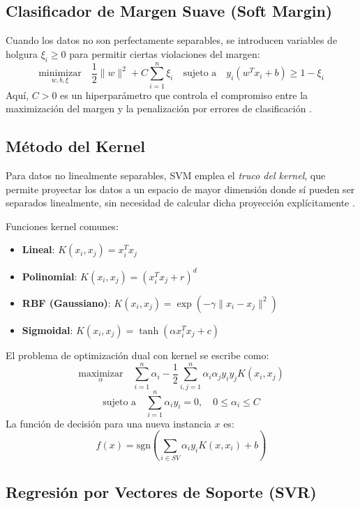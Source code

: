 	\subsection{Clasificador de Margen Suave (Soft Margin)}
	
	Cuando los datos no son perfectamente separables, se introducen variables de holgura $\xi_i \geq 0$ para permitir ciertas violaciones del margen:
	\[
	\underset{w, b, \xi}{\text{minimizar}} \quad \frac{1}{2} \|w\|^2 + C \sum_{i=1}^{n} \xi_i \quad \text{sujeto a} \quad y_i(w^T x_i + b) \geq 1 - \xi_i
	\]
	Aquí, $C > 0$ es un hiperparámetro que controla el compromiso entre la maximización del margen y la penalización por errores de clasificación \citep{james2013, veirana2021}.
	
	\subsection{Método del Kernel}
	
	Para datos no linealmente separables, SVM emplea el \textit{truco del kernel}, que permite proyectar los datos a un espacio de mayor dimensión donde sí pueden ser separados linealmente, sin necesidad de calcular dicha proyección explícitamente \citep{james2013, veirana2021}.
	
	Funciones kernel comunes:
	\begin{itemize}
		\item \textbf{Lineal}: $K(x_i, x_j) = x_i^T x_j$
		\item \textbf{Polinomial}: $K(x_i, x_j) = (x_i^T x_j + r)^d$
		\item \textbf{RBF (Gaussiano)}: $K(x_i, x_j) = \exp(-\gamma \|x_i - x_j\|^2)$
		\item \textbf{Sigmoidal}: $K(x_i, x_j) = \tanh(\alpha x_i^T x_j + c)$
	\end{itemize}
	
	El problema de optimización dual con kernel se escribe como:
	\[
	\underset{\alpha}{\text{maximizar}} \quad \sum_{i=1}^{n} \alpha_i - \frac{1}{2} \sum_{i,j=1}^{n} \alpha_i \alpha_j y_i y_j K(x_i, x_j)
	\]
	\[
	\text{sujeto a} \quad \sum_{i=1}^{n} \alpha_i y_i = 0, \quad 0 \leq \alpha_i \leq C
	\]
	La función de decisión para una nueva instancia $x$ es:
	\[
	f(x) = \text{sgn} \left( \sum_{i \in SV} \alpha_i y_i K(x, x_i) + b \right)
	\]
	
	\subsection{Regresión por Vectores de Soporte (SVR)}
	
